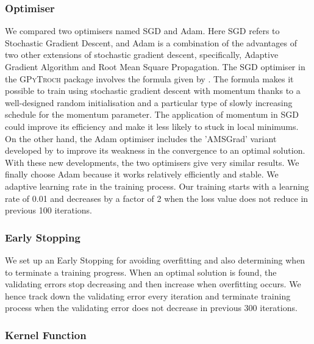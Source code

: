 \subsubsection{Optimiser}

We compared two optimisers named SGD and Adam. Here SGD refers to Stochastic Gradient Descent, and Adam is a combination of the advantages of two other extensions of stochastic gradient descent, specifically, Adaptive Gradient Algorithm and Root Mean Square Propagation. 
%
The SGD optimiser in the \textsc{GPyTroch} package involves the formula given by \citet{sutskever2013importance}. The formula makes it possible to train using stochastic gradient descent with momentum thanks to a well-designed random initialisation and a particular type of slowly increasing schedule for the momentum parameter. The application of momentum in SGD could improve its efficiency and make it less likely to stuck in local minimums. On the other hand, the Adam optimiser includes the 'AMSGrad' variant developed by \citet{47409} to improve its weakness in the convergence to an optimal solution. With these new developments, the two optimisers give very similar results. We finally choose Adam because it works relatively efficiently and stable.  
%
We adaptive learning rate in the training process. Our training starts with a learning rate of 0.01 and decreases by a factor of 2 when the loss value does not reduce in previous 100 iterations.    

\subsubsection{Early Stopping}

We set up an Early Stopping for avoiding overfitting and also determining when to terminate a training progress. 
When an optimal solution is found, the validating errors stop decreasing and then increase when overfitting occurs. 
We hence track down the validating error every iteration and terminate training process when the validating error does not decrease in previous 300 iterations. 	

\subsubsection{Kernel Function}

